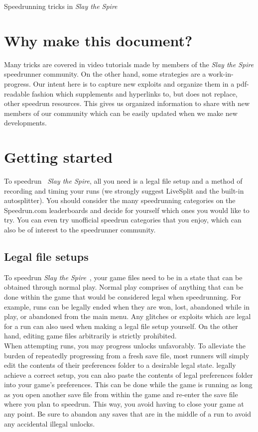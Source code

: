 \documentclass[12pt]{amsart}
\newcommand{\sts}{\textit{Slay the Spire}}
\begin{document}
{\Huge Speedrunning tricks in \textit{Slay the Spire}}
\\
\thispagestyle{plain}

\tableofcontents

\section{Why make this document? }
Many tricks are covered in video tutorials made by members of the \textit{Slay the Spire} speedrunner community.  
On the other hand, some strategies are a work-in-progress. 
Our intent here is to capture new exploits and organize them in a pdf-readable fashion which supplements and hyperlinks to, but does not replace, other speedrun resources.  
This gives us organized information to share with new members of our community which can be easily updated when we make new developments. 
\cite{ForgottenArbiterMoreGlitches}


\section{Getting started}
To speedrun ~\sts, all you need is a legal file setup and a method of recording and timing your runs (we strongly suggest LiveSplit and the built-in autosplitter).  
You should consider the many speedrunning categories on the \textrm{Speedrun.com} leaderboards \cite{SlayTheSpireLeaderboards} and decide for yourself which ones you would like to try.  
You can even try unofficial speedrun categories that you enjoy, which can also be of interest to the speedrunner community.  
\subsection{Legal file setups}
To speedrun \sts~, your game files need to be in a state that can be obtained through normal play.  
Normal play comprises of anything that can be done within the game that would be considered legal when speedrunning.  
For example, runs can be legally ended when they are won, lost, abandoned while in play, or abandoned from the main menu.  
Any glitches or exploits which are legal for a run can also used when making a legal file setup yourself.  
On the other hand, editing game files arbitrarily is strictly prohibited.  
\\

When attempting runs, you may progress unlocks unfavorably.  
To alleviate the burden of repeatedly progressing from a fresh save file, most runners will simply edit the contents of their \textrm{preferences} folder to a desirable legal state.  
 legally achieve a correct setup, you can also paste the contents of legal \textrm{preferences} folder into your game's \textrm{preferences}.  
This can be done while the game is running as long as you open another save file from within the game and re-enter the save file where you plan to speedrun.  
This way, you avoid having to close your game at any point.  
Be sure to abandon any saves that are in the middle of a run to avoid any accidental illegal unlocks.  \\
\end{document}
